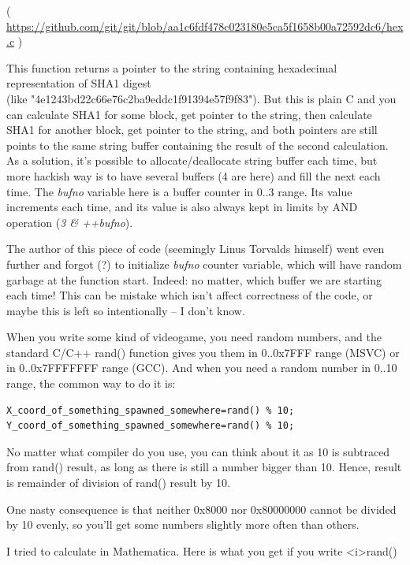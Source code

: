 ( \url{https://github.com/git/git/blob/aa1c6fdf478c023180e5ca5f1658b00a72592dc6/hex.c} )

This function returns a pointer to the string containing hexadecimal representation of SHA1 digest \\
(like "4e1243bd22c66e76c2ba9eddc1f91394e57f9f83").
But this is plain C and you can calculate SHA1 for some block, get pointer to the string, then calculate SHA1 for another block, get pointer to the string,
and both pointers are still points to the same string buffer containing the result of the second calculation.
As a solution, it's possible to allocate/deallocate string buffer each time, but more hackish way is to have several buffers (4 are here) and fill the next each time.
The \textit{bufno} variable here is a buffer counter in 0..3 range.
Its value increments each time, and its value is also always
kept in limits
by AND operation (\textit{3 \& ++bufno}).

The author of this piece of code (seemingly Linus Torvalds himself) went even further and forgot (?)
to initialize \textit{bufno} counter variable, which will
have random garbage at the function start.
Indeed: no matter, which buffer we are starting each time!
This can be mistake which isn't affect correctness of the code, or maybe this is left so intentionally -- I don't know.


When you write some kind of videogame, you need random numbers, and the standard C/C++ rand() function gives you them in 0..0x7FFF range (MSVC)
or in 0..0x7FFFFFFF range (GCC).
And when you need a random number in 0..10 range, the common way to do it is:

\begin{lstlisting}
X_coord_of_something_spawned_somewhere=rand() % 10;
Y_coord_of_something_spawned_somewhere=rand() % 10;
\end{lstlisting}

No matter what compiler do you use, you can think about it as 10 is subtraced from rand() result, as long as there is still
a number bigger than 10.
Hence, result is remainder of division of rand() result by 10.

One nasty consequence is that neither 0x8000 nor 0x80000000 cannot be divided by 10 evenly, so you'll get some numbers slightly more often than others.

I tried to calculate in Mathematica. Here is what you get if you write <i>rand() %

